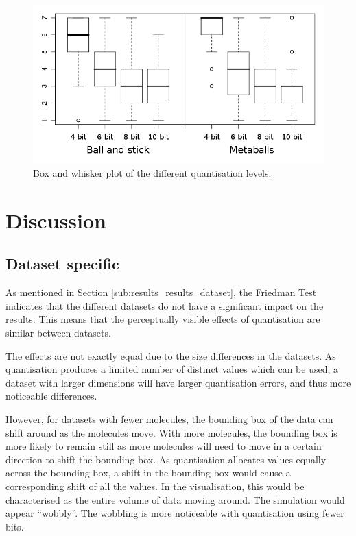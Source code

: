 \begin{figure}
  \begin{center}
    \includegraphics[width=120mm]{boxwhisker_all_both}
  \end{center}
  \caption{Box and whisker plot of the different quantisation levels.}
  \label{fig:results_boxwhisker_all}
\end{figure}



\section{Discussion}
\label{sec:results_discussion}

\subsection*{Dataset specific}
\label{sub:results_discussion_dataset}

As mentioned in Section \ref{sub:results_results_dataset}, the Friedman
Test indicates that the different datasets do not have a significant impact on
the results. This means that the perceptually visible effects of quantisation
are similar between datasets.

The effects are not exactly equal due to the size differences in the datasets.
As quantisation produces a limited number of distinct values which can be used,
a dataset with larger dimensions will have larger quantisation errors, and thus
more noticeable differences.

However, for datasets with fewer molecules, the bounding box of the data can
shift around as the molecules move. With more molecules, the bounding box is
more likely to remain still as more molecules will need to move in a certain
direction to shift the bounding box. As quantisation allocates values equally
across the bounding box, a shift in the bounding box would cause a
corresponding shift of all the values. In the visualisation, this would be
characterised as the entire volume of data moving around. The simulation would
appear ``wobbly''. The wobbling is more noticeable with quantisation using
fewer bits.

